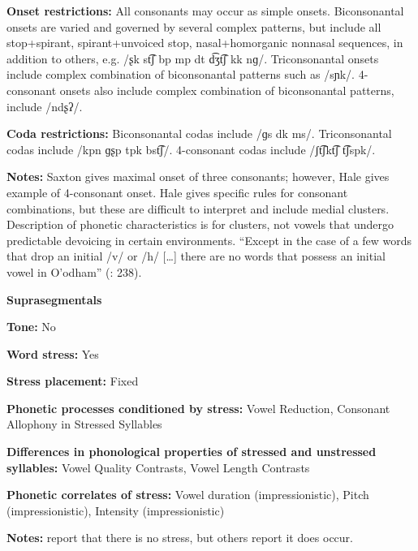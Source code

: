 \textbf{Onset restrictions:} All consonants may occur as simple onsets. Biconsonantal onsets are varied and governed by several complex patterns, but include all stop+spirant, spirant+unvoiced stop, nasal+homorganic nonnasal sequences, in addition to others, e.g. /ʂk st͡ʃ bp mp dt d͡ʒt͡ʃ kk nɡ/. Triconsonantal onsets include complex combination of biconsonantal patterns such as /sɲk/. 4-consonant onsets also include complex combination of biconsonantal patterns, include /ndʂʔ/.



\textbf{Coda restrictions:} Biconsonantal codas include /ɡs dk ms/. Triconsonantal codas include /kpn ɡʂp tpk bst͡ʃ/. 4-consonant codas include /ʃt͡ʃkt͡ʃ t͡ʃspk/.



\textbf{Notes:} Saxton gives maximal onset of three consonants; however, Hale gives example of 4-consonant onset. Hale gives specific rules for consonant combinations, but these are difficult to interpret and include medial clusters. Description of phonetic characteristics is for clusters, not vowels that undergo predictable devoicing in certain environments. “Except in the case of a few words that drop an initial /v/ or /h/ […] there are no words that possess an initial vowel in O’odham” (\citealt{DoloresMathiot1991}: 238).



\textbf{Suprasegmentals}



\textbf{Tone:} No



\textbf{Word stress:} Yes



\textbf{Stress placement:} Fixed



\textbf{Phonetic processes conditioned by stress:} Vowel Reduction, Consonant Allophony in Stressed Syllables



\textbf{Differences in phonological properties of stressed and unstressed syllables:} Vowel Quality Contrasts, Vowel Length Contrasts



\textbf{Phonetic correlates of stress:} Vowel duration (impressionistic), Pitch (impressionistic), Intensity (impressionistic)



\textbf{Notes:} \citet{DoloresMathiot1991} report that there is no stress, but others report it does occur.



